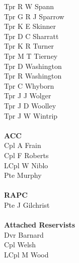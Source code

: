 \begin{multicols}{3}
  Tpr R W Spann \\
  Tpr G R J Sparrow \\
  Tpr K E Skinner \\
  Tpr D C Sharratt \\
  Tpr K R Turner \\
  Tpr M T Tierney \\
  Tpr D Washington \\
  Tpr R Washington \\
  Tpr C Whyborn \\
  Tpr J J Wolger \\
  Tpr J D Woolley \\
  Tpr J W Wintrip \\
  \\
  \textbf{ACC} \\
  Cpl A Frain \\
  Cpl F Roberts \\
  LCpl W Niblo \\
  Pte Murphy \\
  \\
  \textbf{RAPC} \\
  Pte J Gilchrist \\
  \\
  \textbf{Attached Reservists} \\
  Dvr Barnard \\
  Cpl Welsh \\
  LCpl M Wood \\
\end{multicols}
